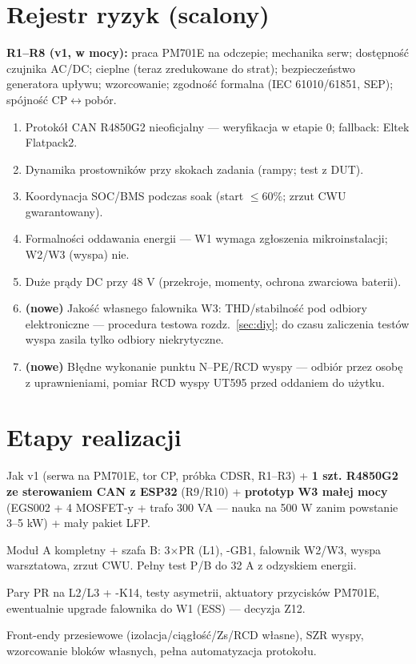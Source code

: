 \documentclass[11pt,a4paper]{article}
\begin{document}
\section{Rejestr ryzyk (scalony)}
\textbf{R1--R8 (v1, w mocy):} praca PM701E na odczepie; mechanika serw; dostępność czujnika AC/DC;
cieplne (teraz zredukowane do strat); bezpieczeństwo generatora upływu; wzorcowanie; zgodność
formalna (IEC 61010/61851, SEP); spójność CP$\leftrightarrow$pobór.
\begin{enumerate}[label=\textbf{R\arabic*.},start=9]
\item Protokół CAN R4850G2 nieoficjalny --- weryfikacja w etapie 0; fallback: Eltek Flatpack2.
\item Dynamika prostowników przy skokach zadania (rampy; test z DUT).
\item Koordynacja SOC/BMS podczas soak (start $\le$60\%; zrzut CWU gwarantowany).
\item Formalności oddawania energii --- W1 wymaga zgłoszenia mikroinstalacji; W2/W3 (wyspa) nie.
\item Duże prądy DC przy 48 V (przekroje, momenty, ochrona zwarciowa baterii).
\item \textbf{(nowe)} Jakość własnego falownika W3: THD/stabilność pod odbiory elektroniczne ---
procedura testowa rozdz.~\ref{sec:diy}; do czasu zaliczenia testów wyspa zasila tylko odbiory
niekrytyczne.
\item \textbf{(nowe)} Błędne wykonanie punktu N--PE/RCD wyspy --- odbiór przez osobę z uprawnieniami,
pomiar RCD wyspy UT595 przed oddaniem do użytku.
\end{enumerate}

\section{Etapy realizacji}
\begin{description}[style=nextline]
\item[Etap 0 --- prototyp weryfikacyjny.] Jak v1 (serwa na PM701E, tor CP, próbka CDSR, R1--R3)
+ \textbf{1 szt. R4850G2 ze sterowaniem CAN z ESP32} (R9/R10) + \textbf{prototyp W3 małej mocy}
(EGS002 + 4 MOSFET-y + trafo 300 VA --- nauka na 500 W zanim powstanie 3--5 kW) + mały pakiet LFP.
\item[Etap 1 --- stacja użyteczna 1F.] Moduł A kompletny + szafa B: 3$\times$PR (L1), -GB1,
falownik W2/W3, wyspa warsztatowa, zrzut CWU. Pełny test P/B do 32 A z odzyskiem energii.
\item[Etap 2 --- rozbudowa 3F.] Pary PR na L2/L3 + -K14, testy asymetrii, aktuatory przycisków
PM701E, ewentualnie upgrade falownika do W1 (ESS) --- decyzja Z12.
\item[Etap 3 --- rozszerzenia.] Front-endy przesiewowe (izolacja/ciągłość/Zs/RCD własne), SZR
wyspy, wzorcowanie bloków własnych, pełna automatyzacja protokołu.
\end{description}
\end{document}
